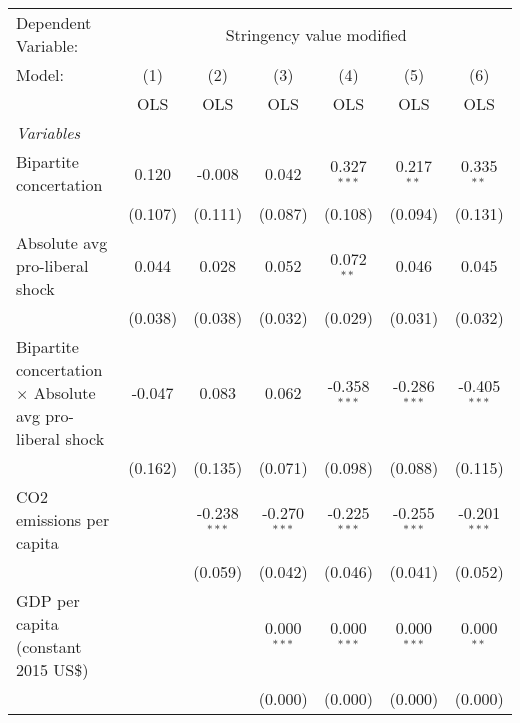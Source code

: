 
\begingroup
\centering
\begin{tabular}{lcccccc}
   \toprule
   Dependent Variable: & \multicolumn{6}{c}{Stringency value modified}\\
   Model:                                                          & (1)     & (2)            & (3)            & (4)            & (5)            & (6)\\  
                                                                   &  OLS    & OLS            & OLS            & OLS            & OLS            & OLS\\  
   \midrule
   \emph{Variables}\\
   Bipartite concertation                                          & 0.120   & -0.008         & 0.042          & 0.327$^{***}$  & 0.217$^{**}$   & 0.335$^{**}$\\   
                                                                   & (0.107) & (0.111)        & (0.087)        & (0.108)        & (0.094)        & (0.131)\\   
   Absolute avg pro-liberal shock                                  & 0.044   & 0.028          & 0.052          & 0.072$^{**}$   & 0.046          & 0.045\\   
                                                                   & (0.038) & (0.038)        & (0.032)        & (0.029)        & (0.031)        & (0.032)\\   
   Bipartite concertation $\times$ Absolute avg pro-liberal shock  & -0.047  & 0.083          & 0.062          & -0.358$^{***}$ & -0.286$^{***}$ & -0.405$^{***}$\\   
                                                                   & (0.162) & (0.135)        & (0.071)        & (0.098)        & (0.088)        & (0.115)\\   
   CO2 emissions per capita                                        &         & -0.238$^{***}$ & -0.270$^{***}$ & -0.225$^{***}$ & -0.255$^{***}$ & -0.201$^{***}$\\   
                                                                   &         & (0.059)        & (0.042)        & (0.046)        & (0.041)        & (0.052)\\   
   GDP per capita (constant 2015 US\$)                             &         &                & 0.000$^{***}$  & 0.000$^{***}$  & 0.000$^{***}$  & 0.000$^{**}$\\   
                                                                   &         &                & (0.000)        & (0.000)        & (0.000)        & (0.000)\\   

\end{tabular}
